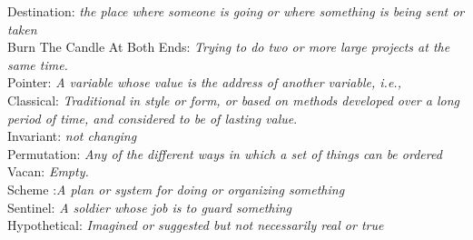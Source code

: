 \documentclass[12pt,a4paper]{article}
\begin{document}
\textbullet \hspace{0.5cm}Destination:\textit{ the place where someone is going or where something is being sent or taken}\\
\textbullet \hspace{0.5cm}Burn The Candle At Both Ends:\textit{ Trying to do two or more large projects at the same time.}\\
\textbullet \hspace{0.5cm}Pointer: \textit{A variable whose value is the address of another variable, i.e.,}\\
\textbullet \hspace{0.5cm}Classical:\textit{ Traditional in style or form, or based on methods developed over a long period of time, and considered to be of lasting value}.\\
\textbullet \hspace{0.5cm}Invariant: \textit{not changing}\\
\textbullet \hspace{0.5cm}Permutation: \textit{Any of the different ways in which a set of things can be ordered}\\
\textbullet \hspace{0.5cm}Vacan: \textit{Empty.}\\
\textbullet \hspace{0.5cm}Scheme :\textit{A plan or system for doing or organizing something}\\
\textbullet \hspace{0.5cm}Sentinel: \textit{A soldier whose job is to guard something}\\
\textbullet \hspace{0.5cm}Hypothetical: \textit{Imagined or suggested but not necessarily real or true}\\
\end{document}
